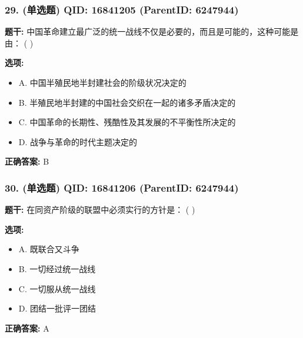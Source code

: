 \documentclass[12pt,UTF8]{ctexart}
\begin{document}
\subsubsection*{29. (单选题) \small QID: 16841205 (ParentID: 6247944)}

\textbf{题干:}
中国革命建立最广泛的统一战线不仅是必要的，而且是可能的，这种可能是由： ( )



\textbf{选项:}
\begin{itemize}[leftmargin=*]

  \item A. 中国半殖民地半封建社会的阶级状况决定的

  \item B. 半殖民地半封建的中国社会交织在一起的诸多矛盾决定的

  \item C. 中国革命的长期性、残酷性及其发展的不平衡性所决定的

  \item D. 战争与革命的时代主题决定的

\end{itemize}

\textbf{正确答案:}
B

\vspace{0.3em}\hrulefill\vspace{0.7em}

\subsubsection*{30. (单选题) \small QID: 16841206 (ParentID: 6247944)}

\textbf{题干:}
在同资产阶级的联盟中必须实行的方针是： ( )



\textbf{选项:}
\begin{itemize}[leftmargin=*]

  \item A. 既联合又斗争

  \item B. 一切经过统一战线

  \item C. 一切服从统一战线

  \item D. 团结一批评一团结

\end{itemize}

\textbf{正确答案:}
A

\vspace{0.3em}\hrulefill\vspace{0.7em}
\end{document}
